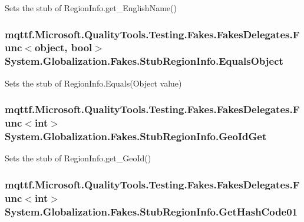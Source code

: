 Sets the stub of Region\-Info.\-get\-\_\-\-English\-Name()

\hypertarget{class_system_1_1_globalization_1_1_fakes_1_1_stub_region_info_a6b165db08b912fd6ae060db0f4f8e825}{
\subsubsection[{Equals\-Object}]{\setlength{\rightskip}{0pt plus 5cm}mqttf.\-Microsoft.\-Quality\-Tools.\-Testing.\-Fakes.\-Fakes\-Delegates.\-Func$<$object, bool$>$ System.\-Globalization.\-Fakes.\-Stub\-Region\-Info.\-Equals\-Object}}\label{class_system_1_1_globalization_1_1_fakes_1_1_stub_region_info_a6b165db08b912fd6ae060db0f4f8e825}


Sets the stub of Region\-Info.\-Equals(\-Object value)

\hypertarget{class_system_1_1_globalization_1_1_fakes_1_1_stub_region_info_aff83be7a21cde8bcfd6e073f5b58f59d}{
\subsubsection[{Geo\-Id\-Get}]{\setlength{\rightskip}{0pt plus 5cm}mqttf.\-Microsoft.\-Quality\-Tools.\-Testing.\-Fakes.\-Fakes\-Delegates.\-Func$<$int$>$ System.\-Globalization.\-Fakes.\-Stub\-Region\-Info.\-Geo\-Id\-Get}}\label{class_system_1_1_globalization_1_1_fakes_1_1_stub_region_info_aff83be7a21cde8bcfd6e073f5b58f59d}


Sets the stub of Region\-Info.\-get\-\_\-\-Geo\-Id()

\hypertarget{class_system_1_1_globalization_1_1_fakes_1_1_stub_region_info_ac255f0b1586efbf0241351f569d49c70}{
\subsubsection[{Get\-Hash\-Code01}]{\setlength{\rightskip}{0pt plus 5cm}mqttf.\-Microsoft.\-Quality\-Tools.\-Testing.\-Fakes.\-Fakes\-Delegates.\-Func$<$int$>$ System.\-Globalization.\-Fakes.\-Stub\-Region\-Info.\-Get\-Hash\-Code01}}\label{class_system_1_1_globalization_1_1_fakes_1_1_stub_region_info_ac255f0b1586efbf0241351f569d49c70}


